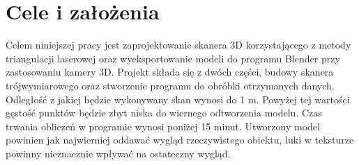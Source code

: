 \section{Cele i założenia}
Celem niniejszej pracy jest zaprojektowanie skanera 3D korzystającego z metody triangulacji laserowej  oraz wyeksportowanie modeli do programu Blender przy zastosowaniu kamery 3D. Projekt składa się z dwóch części, budowy skanera trójwymiarowego oraz stworzenie programu do obróbki otrzymanych danych. Odległość z jakiej będzie wykonywany skan wynosi do 1 m. Powyżej tej wartości gęstość punktów będzie zbyt niska do wiernego odtworzenia modelu. Czas trwania obliczeń w programie wynosi poniżej 15 minut. Utworzony model powinien jak najwierniej oddawać wygląd rzeczywistego obiektu, luki w teksturze powinny nieznacznie wpływać na ostateczny wygląd.
